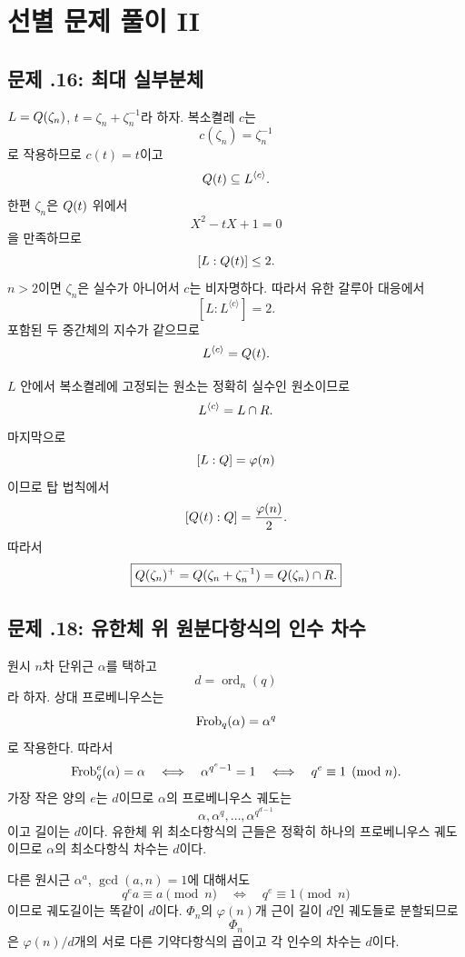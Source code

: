 \clearpage
\section{선별 문제 풀이 II}
\label{sec:cyclotomic-cyclic-solutions-b}

\subsection*{문제 \thechapter.16: 최대 실부분체}

\begin{solution}
$L=Q(\zeta_n)$, $t=\zeta_n+\zeta_n^{-1}$라 하자. 복소켤레 $c$는
\[
  c(\zeta_n)=\zeta_n^{-1}
\]
로 작용하므로 $c(t)=t$이고
\[
  Q(t)\subseteq L^{\langle c\rangle}.
\]
한편 $\zeta_n$은 $Q(t)$ 위에서
\[
  X^2-tX+1=0
\]
을 만족하므로
\[
  [L:Q(t)]\le2.
\]
$n>2$이면 $\zeta_n$은 실수가 아니어서 $c$는 비자명하다. 따라서 유한 갈루아 대응에서
\[
  [L:L^{\langle c\rangle}]=2.
\]
포함된 두 중간체의 지수가 같으므로
\[
  L^{\langle c\rangle}=Q(t).
\]

$L$ 안에서 복소켤레에 고정되는 원소는 정확히 실수인 원소이므로
\[
  L^{\langle c\rangle}=L\cap R.
\]
마지막으로
\[
  [L:Q]=\varphi(n)
\]
이므로 탑 법칙에서
\[
  [Q(t):Q]=\frac{\varphi(n)}2.
\]
따라서
\[
  \boxed{
  Q(\zeta_n)^+
  =Q(\zeta_n+\zeta_n^{-1})
  =Q(\zeta_n)\cap R.}
\]
\end{solution}

\subsection*{문제 \thechapter.18: 유한체 위 원분다항식의 인수 차수}

\begin{solution}
원시 $n$차 단위근 $\alpha$를 택하고
\[
  d=\operatorname{ord}_n(q)
\]
라 하자. 상대 프로베니우스는
\[
  \operatorname{Frob}_q(\alpha)=\alpha^q
\]
로 작용한다. 따라서
\[
  \operatorname{Frob}_q^e(\alpha)=\alpha
  \quad\Longleftrightarrow\quad
  \alpha^{q^e-1}=1
  \quad\Longleftrightarrow\quad
  q^e\equiv1\pmod n.
\]
가장 작은 양의 $e$는 $d$이므로 $\alpha$의 프로베니우스 궤도는
\[
  \alpha,\alpha^q,\dots,\alpha^{q^{d-1}}
\]
이고 길이는 $d$이다. 유한체 위 최소다항식의 근들은 정확히 하나의 프로베니우스 궤도이므로 $\alpha$의 최소다항식 차수는 $d$이다.

다른 원시근 $\alpha^a$, $\gcd(a,n)=1$에 대해서도
\[
  q^e a\equiv a\pmod n
  \quad\Longleftrightarrow\quad
  q^e\equiv1\pmod n
\]
이므로 궤도길이는 똑같이 $d$이다. $\Phi_n$의 $\varphi(n)$개 근이 길이 $d$인 궤도들로 분할되므로
\[
  \Phi_n
\]
은 $\varphi(n)/d$개의 서로 다른 기약다항식의 곱이고 각 인수의 차수는 $d$이다.
\end{solution}

